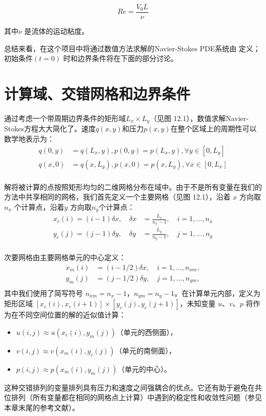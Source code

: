 \documentclass[12pt, a4paper]{article}
\numberwithin{equation}{section} %
\begin{document}
\begin{equation}
Re = \frac{V_0L}{\nu}
\end{equation}

其中$\nu$ 是流体的运动粘度。

总结来看，在这个项目中将通过数值方法求解的Navier-Stokes PDE系统由
定义；初始条件$(t = 0)$ 时和边界条件将在下面的部分讨论。




\newpage
\section{计算域、交错网格和边界条件}
\label{sec:b}
通过考虑一个带周期边界条件的矩形域$ L_x \times L_y$（见图 12.1），数值求解Navier-Stokes方程大大简化了。速度$ q(x, y) $和压力$ p(x, y) $在整个区域上的周期性可以数学地表示为：
\begin{equation}
\begin{aligned}
q(0, y) &= q(L_x, y),p(0, y) = p(L_x, y),\forall y \in \left[ 0,L_y\right] \\
q(x, 0) &= q(x, L_y),p(x, 0) = p(x, L_y),\forall x \in  \left[0, L_x\right] \\
\end{aligned}
\end{equation}

解将被计算的点按照矩形均匀的二维网格分布在域中。由于不是所有变量在我们的方法中共享相同的网格，我们首先定义一个主要网格（见图 12.1），沿着 $x$ 方向取 $n_x$ 个计算点，沿着$y$ 方向取$ n_y $个计算点：
\begin{equation}
\begin{aligned}
x_c(i) = (i - 1)\delta x, \quad \delta x &= \frac{L_x}{n_x - 1},\quad i = 1,..., n_x \\
y_c(j) = (j - 1)\delta y,\quad \delta y &= \frac{L_y}{n_y - 1},\quad j = 1,..., n_y  \\
\end{aligned}
\end{equation}



次要网格由主要网格单元的中心定义：
\begin{equation}
\begin{aligned}
x_m(i) &= (i - 1/2)\delta x,\quad i = 1,...,n_{xm},\\
y_m(j) &= (j - 1/2)\delta y,\quad j = 1,...,n_{ym},\\
\end{aligned}
\end{equation}
其中我们使用了简写符号 $n_{xm} = n_x - 1$，$n_{ym} = n_y - 1$。在计算单元内部，定义为矩形区域 $\left[x_c(i),x_c(i + 1)\right] \times \left[y_c(j), y_c(j + 1)\right]$，未知变量 $u$、$v$、$p$ 将作为在不同空间位置的解的近似值计算：
\begin{itemize}
    \item $u(i, j) \approx u(x_c(i), y_m(j))$（单元的西侧面），
    \item $v(i, j) \approx v(x_m(i), y_c(j))$（单元的南侧面），
    \item $p(i, j) \approx p(x_m(i), y_m(j))$（单元的中心）。
\end{itemize}

这种交错排列的变量排列具有压力和速度之间强耦合的优点。它还有助于避免在共位排列（所有变量都在相同的网格点上计算）中遇到的稳定性和收敛性问题（参见本章末尾的参考文献）。

\newpage


\end{document}
